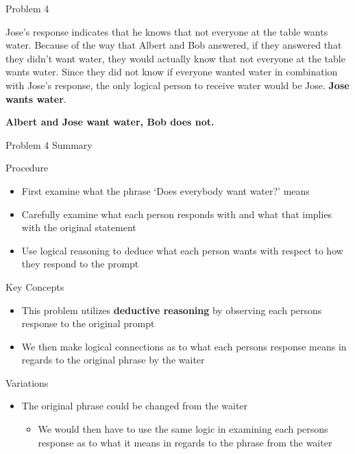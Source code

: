 \begin{problem}{Problem 4}
\begin{Highlight}[Solution]
        Jose's response indicates that he knows that not everyone at the table wants water. Because of the way that Albert and Bob answered, if they answered that they didn't want water, they would actually know
        that not everyone at the table wants water. Since they did not know if everyone wanted water in combination with Jose's response, the only logical person to receive water would be Jose. \textbf{Jose wants
        water}.

        \begin{center}
            \textbf{Albert and Jose want water, Bob does not.}
        \end{center}
    \end{Highlight}
\end{problem}

\begin{summary}{Problem 4 Summary}
    \begin{statement}{Procedure}
        \begin{itemize}
            \item First examine what the phrase `Does everybody want water?' means
            \item Carefully examine what each person responds with and what that implies with the original statement
            \item Use logical reasoning to deduce what each person wants with respect to how they respond to the prompt
        \end{itemize}
    \end{statement}
    \begin{statement}{Key Concepts}
        \begin{itemize}
            \item This problem utilizes \textbf{deductive reasoning} by observing each persons response to the original prompt
            \item We then make logical connections as to what each persons response means in regards to the original phrase by the waiter
        \end{itemize}
    \end{statement}
    \begin{statement}{Variations}
        \begin{itemize}
            \item The original phrase could be changed from the waiter
            \begin{itemize}
                \item We would then have to use the same logic in examining each persons response as to what it means in regards to the phrase from the waiter

\end{itemize}
\end{itemize}
\end{statement}
\end{summary}
